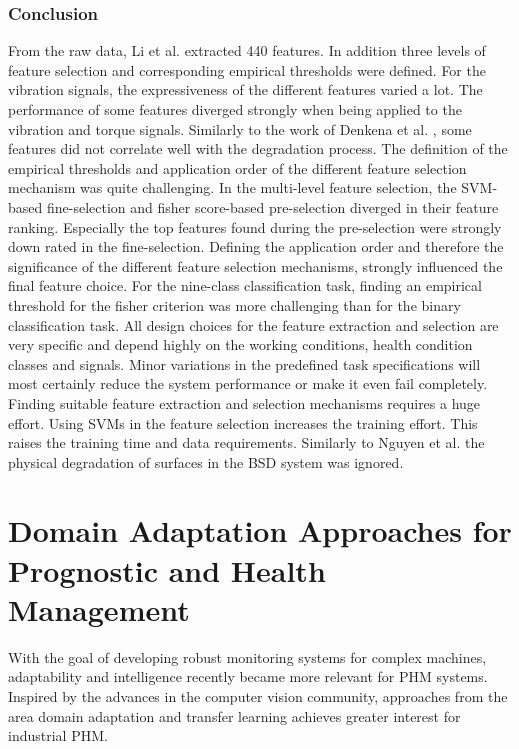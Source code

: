 \subsubsection{Conclusion}
From the raw data, Li et al. \cite{LiPin2018} extracted 440 features. In addition three levels of feature selection and corresponding empirical thresholds were defined. For the vibration signals, the expressiveness of the different features varied a lot. The performance of some features diverged strongly when being applied to the vibration and torque signals. Similarly to the work of Denkena et al. \cite{Denkena2021}, some features did not correlate well with the degradation process. The definition of the empirical thresholds and application order of the different feature selection mechanism was quite challenging. In the multi-level feature selection, the SVM-based fine-selection and fisher score-based pre-selection diverged in their feature ranking. Especially the top features found during the pre-selection were strongly down rated in the fine-selection. Defining the application order and therefore the significance of the different feature selection mechanisms, strongly influenced the final feature choice. For the nine-class classification task, finding an empirical threshold for the fisher criterion was more challenging than for the binary classification task. All design choices for the feature extraction and selection are very specific and depend highly on the working conditions, health condition classes and signals. Minor variations in the predefined task specifications will most certainly reduce the system performance or make it even fail completely. Finding suitable feature extraction and selection mechanisms requires a huge effort. Using SVMs in the feature selection increases the training effort. This raises the training time and data requirements. Similarly to Nguyen et al. \cite{NGUYEN2019} the physical degradation of surfaces in the BSD system was ignored. 


\section{Domain Adaptation Approaches for Prognostic and Health Management}
With the goal of developing robust monitoring systems for complex machines, adaptability and intelligence recently became more relevant for PHM systems. Inspired by the advances in the computer vision community, approaches from the area domain adaptation and transfer learning achieves greater interest for industrial PHM. 

